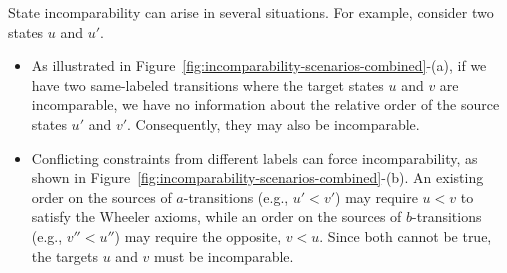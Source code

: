 \begin{example} \label{ex:incomparability}
    State incomparability can arise in several situations. For example, consider two states $u$ and $u'$.
    \begin{itemize}
        \item As illustrated in Figure~\ref{fig:incomparability-scenarios-combined}-(a), if we have two same-labeled transitions where the target states $u$ and $v$ are incomparable, we have no information about the relative order of the source states $u'$ and $v'$. Consequently, they may also be incomparable.
        \item Conflicting constraints from different labels can force incomparability, as shown in Figure~\ref{fig:incomparability-scenarios-combined}-(b). An existing order on the sources of $a$-transitions (e.g., $u' < v'$) may require $u < v$ to satisfy the Wheeler axioms, while an order on the sources of $b$-transitions (e.g., $v'' < u''$) may require the opposite, $v < u$. Since both cannot be true, the targets $u$ and $v$ must be incomparable.
    \end{itemize}

    \begin{figure}[H]
    \centering
    \begin{subfigure}[b]{0.4\textwidth}
        \centering
        \caption{}
        \label{fig:incomparability-scenario1}
    \end{subfigure}
    \hfill
    \begin{subfigure}[b]{0.55\textwidth}
        \centering
\end{subfigure}
\end{figure}
\end{example}
